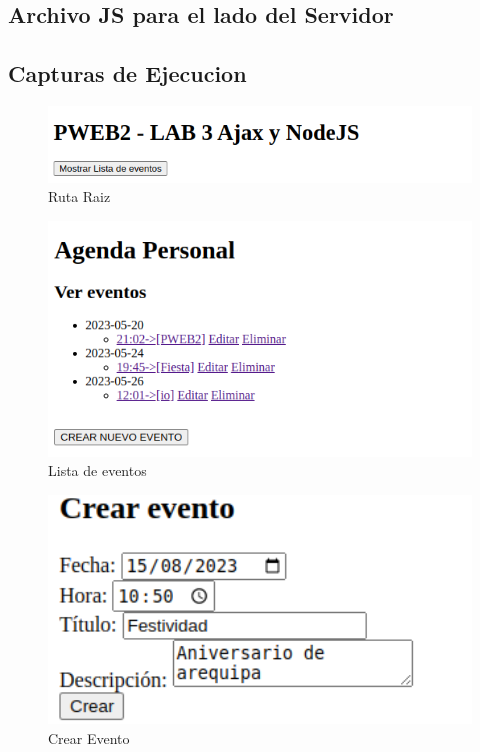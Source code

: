 \documentclass{article}
\begin{document}
\subsection{Archivo JS para el lado del Servidor}


\subsection{Capturas de Ejecucion}
\begin{figure}[H]
    \centering
    \includegraphics[scale=0.5]{img/exe/ruta-raiz.png}
    \caption{Ruta Raiz}
\end{figure}
\begin{figure}[H]
    \centering
    \includegraphics[scale=0.5]{img/exe/lista-inicial.png}
    \caption{Lista de eventos}
\end{figure}
\begin{figure}[H]
    \centering
    \includegraphics[scale=0.5]{img/exe/crear-evento.png}
    \caption{Crear Evento}
\end{figure}
\end{document}
